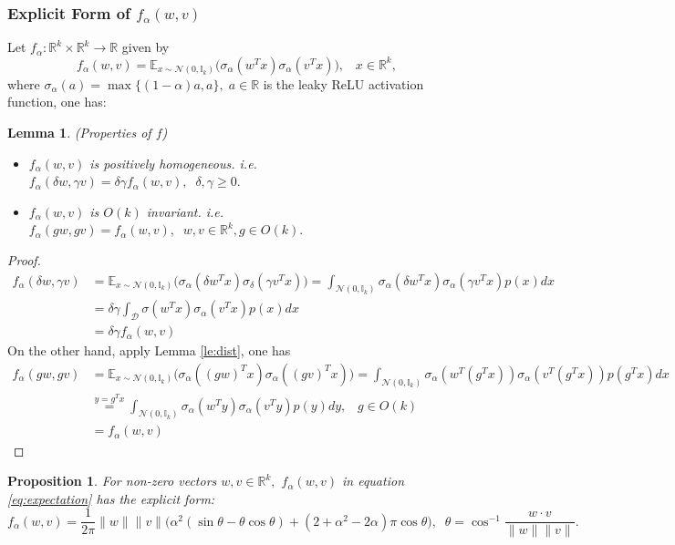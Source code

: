 \documentclass{amsart}%
\newtheorem{lemma}[theorem]{Lemma}
\newtheorem{proposition}[theorem]{Proposition}
\begin{document}
\subsubsection{Explicit Form of $f_{\alpha}( w,v)$}
Let $f_{\alpha}:\mathbb{R}^k\times \mathbb{R}^k \to \mathbb{R}$ given by
\begin{equation}\label{eq:expectation}
f_{\alpha}( w, v)=\mathbb{E}_{x\sim {\mathcal{N}(0,\mathbb{I}_k)}}\Big(\sigma_{\alpha}(w^Tx)\sigma_{\alpha}( v^T x)\Big),\;\; \;x\in \mathbb{R}^k,
\end{equation}
where $\sigma_{\alpha}(a)=\max\{(1-\alpha)a,a\},\; a\in \mathbb{R}$ is the leaky ReLU activation function, one has:
\begin{lemma}\label{le:property_f}(Properties of $f$)
\begin{itemize}
   \item[i)] $f_{\alpha}(w, v)$ is positively homogeneous. i.e. $f_{\alpha}(\delta  w, \gamma v)=\delta \gamma f_{\alpha}( w, v),\;\; \delta, \gamma \geq 0.$
   \item[ii)] $f_{\alpha}( w,  v)$ is $O(k)$ invariant. i.e. $f_{\alpha}(gw,g v)=f_{\alpha}( w, v),\;\;  w, v \in \mathbb{R}^k, g\in O(k).$
\end{itemize}
\end{lemma}
\begin{proof}
\begin{align*}
    f_{\alpha}(\delta w, \gamma v)
&=\mathbb{E}_{x\sim {\mathcal{N}(0,\mathbb{I}_k)}}\Big(\sigma_{\alpha}(\delta  w^Tx)\sigma_{\delta}(\gamma v^Tx)\Big)=\int_{\mathcal{N}(0,\mathbb{I}_k)}\sigma_{\alpha}(\delta w^Tx)\sigma_{\alpha}(\gamma v^T x)p(x)d x\\
&=\delta \gamma \int_{\mathcal D}\sigma(w^Tx)\sigma_{\alpha}(v^Tx)p( x)dx\\
&=\delta\gamma f_{\alpha}( w, v)
\end{align*}
On the other hand, apply Lemma \eqref{le:dist}, one has
\begin{align*}
    f_{\alpha}(g w, g  v)
&=\mathbb{E}_{x\sim {\mathcal{N}(0,\mathbb{I}_k)}}\Big(\sigma_{\alpha}((gw)^Tx)\sigma_{\alpha}((gv)^Tx)\Big)=\int_{\mathcal{N}(0,\mathbb{I}_k)}\sigma_{\alpha}(w^T(g^Tx))\sigma_{\alpha}( v^T(g^Tx))p(g^Tx)d x\\
&\overset{ y=g^Tx}{=}\int_{\mathcal{N}(0,\mathbb{I}_k)}\sigma_{\alpha}(w^T y)\sigma_{\alpha}( v^Ty)p( y)d y,\;\;\; g\in O(k)\\
&=f_{\alpha}( w, v)
\end{align*}
\end{proof}
\begin{proposition}
    For non-zero vectors $ w,v\in \mathbb{R}^k,$ $f_{\alpha}( w, v)$ in equation \eqref{eq:expectation} has the explicit form:
    \begin{equation*} 
        f_{\alpha}(w,v)=\frac{1}{2\pi}\|w\|\|v\|\Big(\alpha^2(\sin\theta-\theta\cos\theta)+(2+\alpha^2-2\alpha)\pi\cos\theta\Big), \;\; \theta=\cos^{-1}\frac
        {w\cdot v}{\|w\|\| v\|}.
    \end{equation*}
\end{proposition}
\end{document}
